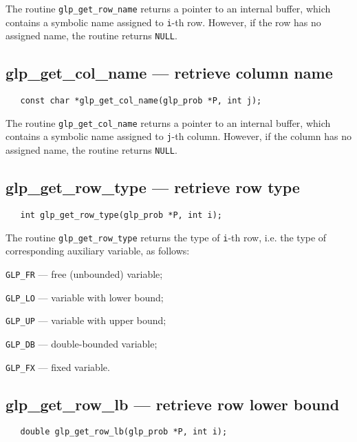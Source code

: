 \returns

The routine \verb|glp_get_row_name| returns a pointer to an internal
buffer, which contains a symbolic name assigned to \verb|i|-th row.
However, if the row has no assigned name, the routine returns
\verb|NULL|.

\subsection{glp\_get\_col\_name --- retrieve column name}

\synopsis

\begin{verbatim}
   const char *glp_get_col_name(glp_prob *P, int j);
\end{verbatim}

\returns

The routine \verb|glp_get_col_name| returns a pointer to an internal
buffer, which contains a symbolic name assigned to \verb|j|-th column.
However, if the column has no assigned name, the routine returns
\verb|NULL|.

\subsection{glp\_get\_row\_type --- retrieve row type}

\synopsis

\begin{verbatim}
   int glp_get_row_type(glp_prob *P, int i);
\end{verbatim}

\returns

The routine \verb|glp_get_row_type| returns the type of \verb|i|-th
row, i.e. the type of corresponding auxiliary variable, as follows:

\verb|GLP_FR| --- free (unbounded) variable;

\verb|GLP_LO| --- variable with lower bound;

\verb|GLP_UP| --- variable with upper bound;

\verb|GLP_DB| --- double-bounded variable;

\verb|GLP_FX| --- fixed variable.

\subsection{glp\_get\_row\_lb --- retrieve row lower bound}

\synopsis

\begin{verbatim}
   double glp_get_row_lb(glp_prob *P, int i);
\end{verbatim}

